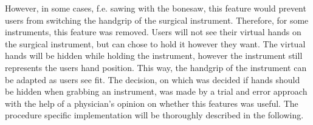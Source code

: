 However, in some cases, f.e. sawing with the bonesaw, this feature would prevent users from switching the handgrip of the surgical instrument. 
Therefore, for some instruments, this feature was removed.
Users will not see their virtual hands on the surgical instrument, but can chose to hold it however they want.
The virtual hands will be hidden while holding the instrument, however the instrument still represents the users hand position.
This way, the handgrip of the instrument can be adapted as users see fit.
The decision, on which was decided if hands should be hidden when grabbing an instrument, was made by a trial and error approach with the help of a physician's opinion on whether this features was useful.
The procedure specific implementation will be thoroughly described in the following.






